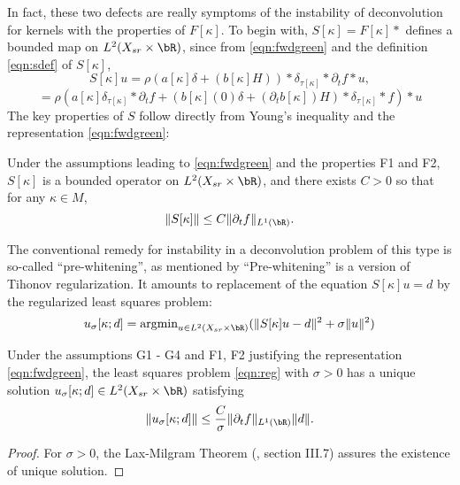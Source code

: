 In fact, these two defects are really symptoms of the instability of
deconvolution for kernels with the properties of $F[\kappa]$.  To
begin with, $S[\kappa] = F[\kappa]*$ defines a bounded map on
$L^2(X_{sr}\times \bR)$, since from \ref{eqn:fwdgreen} and the
definition \ref{eqn:sdef} of  $S[\kappa]$,
\[
  S[\kappa]u = \rho( a[\kappa]\delta    +  (b[\kappa]H)) *\delta_{\tau[\kappa]}*\partial_t f *u,
\]
\begin{equation}
  \label{eqn:sgood}
  = \rho(a[\kappa]\delta_{\tau[\kappa]}*\partial_t f +
  (b[\kappa](0)\delta + (\partial_t b[\kappa])H)
  *\delta_{\tau[\kappa]}*f) * u
\end{equation}
The key properties of $S$ follow directly from Young's inequality and
the representation \ref{eqn:fwdgreen}:
\begin{lemma}
  \label{thm:snorm}
  Under the assumptions leading to \ref{eqn:fwdgreen} and
  the properties F1 and F2, $S[\kappa]$ is a bounded operator on
  $L^2(X_{sr} \times \bR)$, and there exists $C>0$ so
  that for any $\kappa \in M$,
  \begin{equation}
    \label{eqn:snorm}
    \|S[\kappa]\| \le C\|\partial_t f\|_{L^1(\bR)}.
  \end{equation}
\end{lemma}

The conventional remedy for instability in a deconvolution problem of
this type is so-called ``pre-whitening'', as
mentioned by \cite{Warner:16} ``Pre-whitening'' is a version of
Tihonov regularization. It  amounts to replacement of the equation
$S[\kappa]u=d$ by the regularized least squares problem: 
\begin{equation}
  \label{eqn:reg}
  u_{\sigma}[\kappa;d] = \mbox{argmin}_{u \in L^2(X_{sr} \times \bR)} (\|S[\kappa]u-d\|^2 + \sigma\|u\|^2)
\end{equation}

\begin{prop}
  \label{thm:unorm}
  Under the assumptions G1 - G4 and F1, F2 justifying the
  representation \ref{eqn:fwdgreen}, the least squares problem
  \ref{eqn:reg} with $\sigma > 0$ has a unique solution
  $u_{\sigma}[\kappa;d] \in L^2(X_{sr} \times \bR)$ satisfying
  \begin{equation}
    \label{eqn:unorm}
    \|u_{\sigma}[\kappa;d]\| \le \frac{C}{\sigma}\|\partial_t f\|_{L^1(\bR)}\|d\|.
  \end{equation}
\end{prop}
\begin{proof}
For $\sigma > 0$, the Lax-Milgram Theorem (\cite{Yosida}, section
III.7) assures the existence of unique solution. 
\end{proof}

